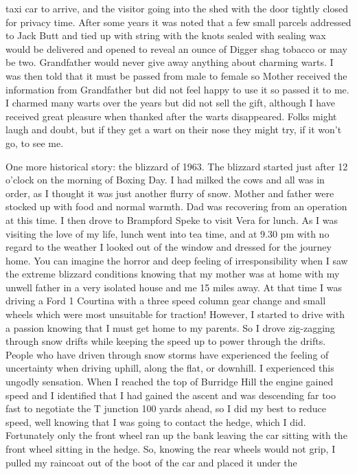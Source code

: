 taxi car to arrive, and the visitor going into the shed with the door tightly
closed for privacy time. After some years it was noted that a few small
parcels addressed to Jack Butt and tied up with string with the knots sealed
with sealing wax would be delivered and opened to reveal an ounce of Digger
shag tobacco or may be two. Grandfather would never give away anything about
charming warts. I was then told that it must be passed from male to female so
Mother received the information from Grandfather but did not feel happy to use
it so passed it to me. I charmed many warts over the years but did not sell
the gift, although I have received great pleasure when thanked after the warts
disappeared. Folks might laugh and doubt, but if they get a wart on their nose
they might try, if it won't go, to see me.

One more historical story: the blizzard of 1963. The blizzard started just after
12 o'clock on the morning of Boxing Day. I had milked the cows and all was in
order, as I thought it was just another flurry of snow. Mother and father were
stocked up with food and normal warmth. Dad was recovering from an operation at
this time. I then drove to Brampford Speke to visit Vera for lunch. As I was
visiting the love of my life, lunch went into tea time, and at 9.30 pm with no
regard to the weather I looked out of the window and dressed for the journey
home. You can imagine the horror and deep feeling of irresponsibility when I
saw the extreme blizzard conditions knowing that my mother was at home with my
unwell father in a very isolated house and me 15 miles away. At that time I was
driving a Ford 1 Courtina with a three speed column gear change and small
wheels which were most unsuitable for traction! However, I started to drive
with a passion knowing that I must get home to my parents. So I drove
zig-zagging through snow drifts while keeping the speed up to power through the
drifts. People who have driven through snow storms have experienced the feeling
of uncertainty when driving uphill, along the flat, or downhill. I experienced
this ungodly sensation. When I reached the top of Burridge Hill the engine
gained speed and I identified that I had gained the ascent and was descending
far too fast to negotiate the T junction 100 yards ahead, so I did my best to
reduce speed, well knowing that I was going to contact the hedge, which I did.
Fortunately only the front wheel ran up the bank leaving the car sitting with
the front wheel sitting in the hedge. So, knowing the rear wheels would not
grip, I pulled my raincoat out of the boot of the car and placed it under the
